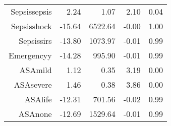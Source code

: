 \begin{tabular}{rrrrr}
$$  Sepsis\-sepsis & 2.24 & 1.07 & 2.10 & 0.04 \\ 
  Sepsis\-shock & -15.64 & 6522.64 & -0.00 & 1.00 \\ 
  Sepsis\-sirs & -13.80 & 1073.97 & -0.01 & 0.99 \\ 
  Emergency\-y & -14.28 & 995.90 & -0.01 & 0.99 \\ 
  ASA\-mild & 1.12 & 0.35 & 3.19 & 0.00 \\ 
  ASA\-severe & 1.46 & 0.38 & 3.86 & 0.00 \\ 
  ASA\-life & -12.31 & 701.56 & -0.02 & 0.99 \\ 
  ASA\-none & -12.69 & 1529.64 & -0.01 & 0.99 \\ 
   \hline
\end{tabular}

